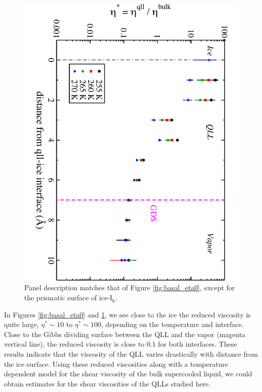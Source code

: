 \begin{figure}
\includegraphics[width=\linewidth]{Figures/prism_eta0}
\caption{\label{fig:prism_eta0} Panel description matches that of
  Figure \ref{fig:basal_eta0}, except for the prismatic surface of
  ice-I$_\mathrm{h}$.}
\end{figure}                

In Figures \ref{fig:basal_eta0} and \ref{fig:prism_eta0}, we see close
to the ice the reduced viscosity is quite large, $\eta^* \sim 10$ to
$\eta^* \sim 100$, depending on the temperature and interface. Close
to the Gibbs dividing surface between the QLL and the vapor (magenta
vertical line), the reduced viscosity is close to 0.1 for both
interfaces. These results indicate that the viscosity of the QLL
varies drastically with distance from the ice surface. Using these
reduced viscosities along with a temperature dependent model for the
shear viscosity of the bulk supercooled liquid, we could obtain
estimates for the shear viscosities of the QLLs studied here.
           
